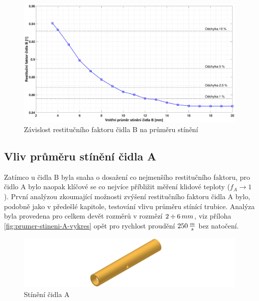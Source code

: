         \begin{figure}[ht!]
            \centering
            \includegraphics*[width=\textwidth, trim={5.9cm 1.0cm 5.8cm 2.0cm}]{400_SIMULACE_KONSTRUKCNICH_UPRAV/Grafy/04_prumer_stineni_B}
            \caption{Závislost restitučního faktoru čidla B na průměru stínění}
            \label{fig:prumer-stineni-B}
        \end{figure}
    
    \newpage
    \subsection{Vliv průměru stínění čidla A} \label{sec:stineni-A}
        Zatímco u čidla B byla snaha o dosažení co nejmenšího restitučního faktoru, pro čidlo A bylo naopak klíčové se co nejvíce příbližit měření klidové teploty ($f_A \rightarrow 1$). První analýzou zkoumající možnosti zvýšení restitučního faktoru čidla A bylo, podobně jako v předešlé kapitole, testování vlivu průměru stínící trubice. Analýza byla provedena pro celkem devět rozměrů v rozmězí $2 \div 6 \, mm$, viz příloha \ref{fig:prumer-stineni-A-vykres} opět pro rychlost proudění $250 \, \frac{m}{s}$ bez natočení.
        
        \begin{figure}[ht!]
            \centering
            \includegraphics[width=\textwidth]{400_SIMULACE_KONSTRUKCNICH_UPRAV/Vykresy_rendery/Stineni_A.png}
            \caption{Stínění čidla A}
            \label{fig:stineni-A}
        \end{figure}

